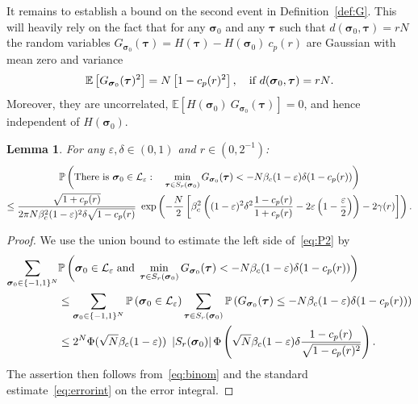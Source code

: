 \documentclass[letterpaper, DIV=17]{scrartcl}
\newtheorem{lemma}[theorem]{Lemma}
\numberwithin{equation}{section}
\theoremstyle{definition}
\newcommand{\btau}{\boldsymbol{\tau} }
\newcommand{\bsig}{\boldsymbol{\sigma} }
\begin{document}
It remains to establish a bound on the second event in Definition~\ref{def:G}. This will heavily rely on the fact that for any  $ \bsig_0 $ and any $ \btau $ such that $ d(\bsig_0 , \btau ) = r N $ the random variables $ G_{\bsig_0}(\btau) =  H(\btau) -  H(\bsig_0) \ c_p\left( r\right) $ are Gaussian with mean zero and variance 
\begin{equation}
\mathbb{E}\left[ G_{\bsig_0} (\btau)^2\right] = N \left[  1 - c_p(r)^2 \right], \quad \mbox{if $ d(\bsig_0,\btau) = r N $.} 
\end{equation} 
Moreover, they are uncorrelated,
$
\mathbb{E}\left[ H(\bsig_0) \  G_{\bsig_0} (\btau)\right] = 0 
$, 
and hence independent of $ H(\bsig_0) $.
\begin{lemma}\label{lem:P2}
    For any $ \varepsilon, \delta \in (0,1) $ and $ r \in (0,2^{-1}) $:
    \begin{multline}\label{eq:P2}
        \mathbb{P}\left( \mbox{There is $ \bsig_0 \in \mathcal{L}_\varepsilon$}: \quad 
        \min_{\btau \in S_r(\bsig_0)} G_{\bsig_0}(\btau) < -N \beta_c (1-\varepsilon) \delta (1-c_p(r) ) \right) \\
        \leq \frac{\sqrt{1+c_p(r)}}{2\pi N \beta_c^2 (1-\varepsilon)^2 \delta \sqrt{1-c_p(r)}}\  \exp\left( - \frac{N}{2} \left[ \beta_c^2\left(  (1-\varepsilon)^2 \delta^2 \frac{1-c_p(r)}{1+c_p(r)} - 2 \varepsilon \left(1 - \frac{\varepsilon}{2}\right) \right) - 2 \gamma(r)  \right] \right).
    \end{multline}
\end{lemma}
\begin{proof}
    We use the union bound to estimate the left side of~\eqref{eq:P2} by
    \begin{align}
         \sum_{\bsig_0 \in \{ -1,1\}^N }& \mathbb{P}\left( \bsig_0 \in \mathcal{L}_\varepsilon \; \mbox{and} \; \min_{\btau \in S_r(\bsig_0)} G_{\bsig_0}(\btau) <- N \beta_c (1-\varepsilon) \delta (1-c_p(r) ) \right) \notag \\
        & \leq  \sum_{\bsig_0 \in \{ -1,1\}^N } \mathbb{P}\left( \bsig_0 \in \mathcal{L}_\varepsilon\right) \sum_{\btau \in S_r(\bsig_0)} \mathbb{P}\left(G_{\bsig_0}(\btau) \leq -N \beta_c (1-\varepsilon) \delta (1-c_p(r) )\right) \notag \\
        & \leq 2^N \Phi(\sqrt{N} \beta_c (1-\varepsilon))\  \left| S_r(\bsig_0) \right| \Phi\left( \sqrt{N} \beta_c (1-\varepsilon) \delta \frac{1-c_p(r) }{\sqrt{1 - c_p(r)^2}} \right) . 
    \end{align}
    The assertion then follows from~\eqref{eq:binom} and the standard estimate~\eqref{eq:errorint} on the error integral. 
\end{proof}
\end{document}

